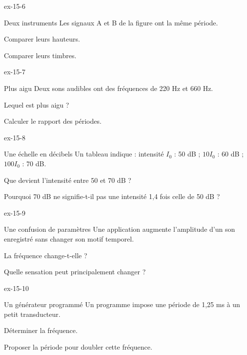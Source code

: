\begin{blocLivre}{ex-15-6}\begin{exercice}[2]{Deux instruments}
Les signaux A et B de la figure ont la même période.
\begin{questions}
\item Comparer leurs hauteurs.
\item Comparer leurs timbres.
\end{questions}
\end{exercice}\end{blocLivre}
\begin{blocLivre}{ex-15-7}\begin{exercice}[2]{Plus aigu}
Deux sons audibles ont des fréquences de 220 Hz et 660 Hz.
\begin{questions}
\item Lequel est plus aigu ?
\item Calculer le rapport des périodes.
\end{questions}
\end{exercice}\end{blocLivre}
\begin{blocLivre}{ex-15-8}\begin{exercice}[2]{Une échelle en décibels}
Un tableau indique : intensité $I_0$ : 50 dB ; $10I_0$ : 60 dB ; $100I_0$ : 70 dB.
\begin{questions}
\item Que devient l’intensité entre 50 et 70 dB ?
\item Pourquoi 70 dB ne signifie-t-il pas une intensité 1,4 fois celle de 50 dB ?
\end{questions}
\end{exercice}\end{blocLivre}
\begin{blocLivre}{ex-15-9}\begin{exercice}[3]{Une confusion de paramètres}
Une application augmente l’amplitude d’un son enregistré sans changer son motif temporel.
\begin{questions}
\item La fréquence change-t-elle ?
\item Quelle sensation peut principalement changer ?
\end{questions}
\end{exercice}\end{blocLivre}
\begin{blocLivre}{ex-15-10}\begin{exercice}[3]{Un générateur programmé}
Un programme impose une période de 1,25 ms à un petit transducteur.
\begin{questions}
\item Déterminer la fréquence.
\item Proposer la période pour doubler cette fréquence.
\end{questions}
\end{exercice}\end{blocLivre}
